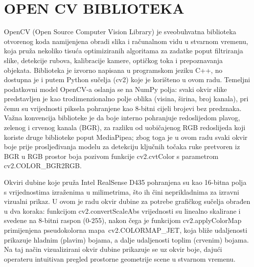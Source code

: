 \documentclass[12pt,a4paper,oneside]{report}
\begin{document}
\chapter{OPEN CV BIBLIOTEKA}
OpenCV (Open Source Computer Vision Library) je sveobuhvatna biblioteka otvorenog koda namijenjena obradi 
slika i računalnom vidu u stvarnom vremenu, koja pruža nekoliko tisuća optimiziranih algoritama za zadatke 
poput filtriranja slike, detekcije rubova, kalibracije kamere, optičkog toka i prepoznavanja objekata. 
Biblioteka je izvorno napisana u programskom jeziku C++, no dostupna je i putem Python sučelja (cv2) koje 
je korišteno u ovom radu. Temeljni podatkovni model OpenCV-a oslanja se na NumPy polja: svaki okvir slike 
predstavljen je kao trodimenzionalno polje oblika (visina, širina, broj kanala), pri čemu su vrijednosti 
piksela pohranjene kao 8-bitni cijeli brojevi bez predznaka. Važna konvencija biblioteke je da boje interno 
pohranjuje redoslijedom plavog, zelenog i crvenog kanala (BGR), za razliku od uobičajenog RGB redoslijeda 
koji koriste druge biblioteke poput MediaPipea; zbog toga je u ovom radu svaki okvir boje prije 
prosljeđivanja modelu za detekciju ključnih točaka ruke pretvoren iz BGR u RGB prostor boja pozivom 
funkcije cv2.cvtColor s parametrom cv2.COLOR\_BGR2RGB.

Okviri dubine koje pruža Intel RealSense D435 pohranjena su kao 16-bitna polja s vrijednostima izraženima u 
milimetrima, što ih čini neprikladnima za izravni vizualni prikaz. U ovom je radu okvir dubine za potrebe 
grafičkog sučelja obrađen u dva koraka: funkcijom cv2.convertScaleAbs vrijednosti su linealno skalirane i 
svedene na 8-bitni raspon (0-255), nakon čega je funkcijom cv2.applyColorMap primijenjena pseudokolorna 
mapa\ cv2.COLORMAP\_JET, koja bliže udaljenosti prikazuje hladnim (plavim) bojama, a dalje udaljenosti 
toplim (crvenim) bojama. Na taj način vizualizirani okvir dubine prikazuje se uz okvir boje, dajući 
operateru intuitivan pregled prostorne geometrije scene u stvarnom vremenu.
\end{document}
